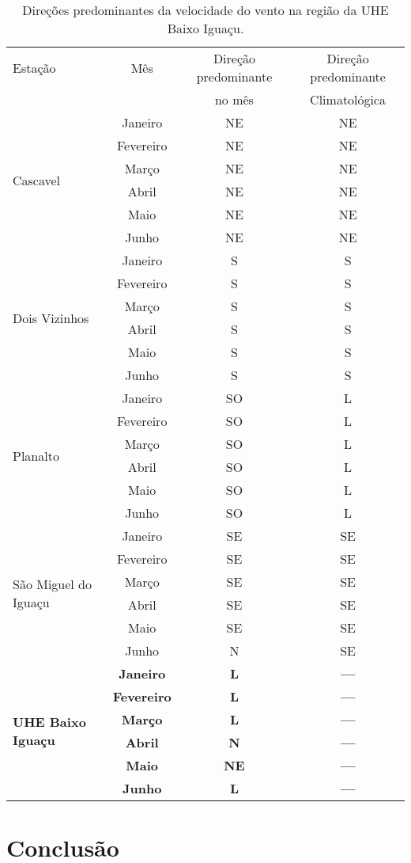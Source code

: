 \documentclass[a4paper,12pt]{article}
\begin{document}
\begin{table}[!hbt]
\begin{center}
\caption{Direções predominantes da velocidade do vento na região da UHE Baixo Iguaçu.}
\label{tab:dire_1}
\begin{tabular}{lccc}
\hline
Estação & Mês & Direção predominante & Direção predominante \\
        &     &      no mês          &      Climatológica   \\
\hline\multirow{6}{*}{Cascavel} & Janeiro & NE & NE \\
            & Fevereiro & NE & NE \\
            & Março & NE & NE \\
            & Abril & NE & NE \\
            & Maio & NE & NE \\
            & Junho & NE & NE \\
\hline\multirow{6}{*}{Dois Vizinhos} & Janeiro & S & S \\
            & Fevereiro & S & S \\
            & Março & S & S \\
            & Abril & S & S \\
            & Maio & S & S \\
            & Junho & S & S \\
\hline\multirow{6}{*}{Planalto} & Janeiro & SO & L \\
            & Fevereiro & SO & L \\
            & Março & SO & L \\
            & Abril & SO & L \\
            & Maio & SO & L \\
            & Junho & SO & L \\
\hline\multirow{6}{*}{São Miguel do Iguaçu} & Janeiro & SE & SE \\
            & Fevereiro & SE & SE \\
            & Março & SE & SE \\
            & Abril & SE & SE \\
            & Maio & SE & SE \\
            & Junho & N & SE \\
\hline\multirow{6}{*}{\textbf{UHE Baixo Iguaçu}} & \textbf{Janeiro} & \textbf{L} & \textbf{---} \\
            & \textbf{Fevereiro} & \textbf{L} & \textbf{{---}} \\
            & \textbf{Março} & \textbf{L} & \textbf{{---}} \\
            & \textbf{Abril} & \textbf{N} & \textbf{{---}} \\
            & \textbf{Maio} & \textbf{NE} & \textbf{{---}} \\
            & \textbf{Junho} & \textbf{L} & \textbf{{---}} \\
\hline
\end{tabular}
\end{center}
\end{table}

\newpage
\section{Conclusão}
\end{document}
